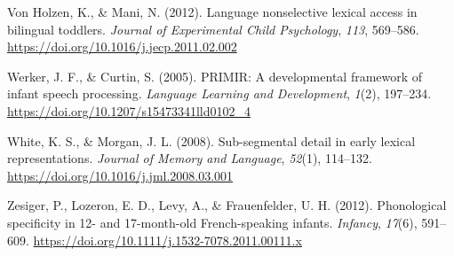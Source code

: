 \documentclass[
  english,
  man, noextraspace]{apa6}
\newlength{\cslhangindent}
\newenvironment{cslreferences}%
  {\setlength{\parindent}{0pt}%
  \everypar{\setlength{\hangindent}{\cslhangindent}}\ignorespaces}%
  {\par}
\begin{document}
\begin{cslreferences}
\leavevmode\hypertarget{ref-VonHolzen2012}{}%
Von Holzen, K., \& Mani, N. (2012). Language nonselective lexical access in bilingual toddlers. \emph{Journal of Experimental Child Psychology}, \emph{113}, 569--586. \url{https://doi.org/10.1016/j.jecp.2011.02.002}

\leavevmode\hypertarget{ref-Werker2005}{}%
Werker, J. F., \& Curtin, S. (2005). PRIMIR: A developmental framework of infant speech processing. \emph{Language Learning and Development}, \emph{1}(2), 197--234. \url{https://doi.org/10.1207/s15473341lld0102_4}

\leavevmode\hypertarget{ref-White2008}{}%
White, K. S., \& Morgan, J. L. (2008). Sub-segmental detail in early lexical representations. \emph{Journal of Memory and Language}, \emph{52}(1), 114--132. \url{https://doi.org/10.1016/j.jml.2008.03.001}

\leavevmode\hypertarget{ref-Zesiger2012}{}%
Zesiger, P., Lozeron, E. D., Levy, A., \& Frauenfelder, U. H. (2012). Phonological specificity in 12- and 17-month-old French-speaking infants. \emph{Infancy}, \emph{17}(6), 591--609. \url{https://doi.org/10.1111/j.1532-7078.2011.00111.x}
\end{cslreferences}

\endgroup
\end{document}
